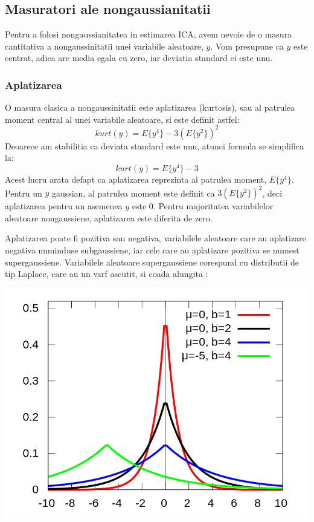 \documentclass[12pt,oneside]{article}
\begin{document}
\subsection{Masuratori ale nongaussianitatii}
Pentru a folosi nongaussianitatea in estimarea ICA, avem nevoie de o masura cantitativa a nongaussinitatii unei variabile aleatoare, $y$. Vom presupune ca $y$ este centrat, adica are media egala cu zero, iar deviatia standard ei este unu. 
\subsubsection{Aplatizarea}
O masura clasica a nongaussinitatii este aplatizarea (kurtosis), sau al patrulea moment central al unei variabile aleatoare, si este definit astfel:
\begin{equation}
kurt(y)=E\{y^4\}-3(E\{y^2\})^2
\end{equation}
Deoarece am stabilitia ca deviata standard este unu, atunci formula se simplifica la:
\begin{equation}
kurt(y)=E\{y^4\}-3
\end{equation}
Acest lucru arata defapt ca aplatizarea reprezinta al patrulea moment, $E\{y^4\}$. Pentru un $y$ gaussian, al patrulea moment este definit ca $3(E\{y^2\})^2$, deci aplatizarea pentru un asemenea $y$ este 0. Pentru majoritatea variabilelor aleatoare nongaussiene, aplatizarea este diferita de zero.

Aplatizarea poate fi pozitiva sau negativa, variabilele aleatoare care au aplatizare negativa numinduse subgaussiene, iar cele care au aplatizare pozitiva se numest supergaussiene. Variabilele aleatoare supergaussiene corespund cu distributii de tip Laplace, care au un varf ascutit, si coada alungita \cite{laplace_distribution_wiki}:
\begin{center}
	\includegraphics[scale=0.3]{laplace_distribution}
 \end{center}
\end{document}
